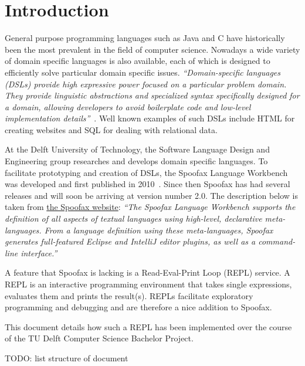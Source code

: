 \chapter{Introduction}
\label{cha:introduction}

General purpose programming languages such as Java and C have historically been
the most prevalent in the field of computer science. Nowadays a wide variety of
domain specific languages is also available, each of which is designed to
efficiently solve particular domain specific issues. \textit{``Domain-specific
languages (DSLs) provide high expressive power focused on a particular problem
domain. They provide linguistic abstractions and specialized syntax
specifically designed for a domain, allowing developers to avoid boilerplate
code and low-level implementation details''}~\cite{Kats10a}. Well known
examples of such DSLs include HTML for creating websites and SQL for dealing
with relational data.

At the Delft University of Technology, the Software Language Design and
Engineering group researches and develops domain specific languages. To
facilitate prototyping and creation of DSLs, the Spoofax Language Workbench was
developed and first published in 2010~\cite{Kats10a}. Since then Spoofax has had
several releases and will soon be arriving at version number 2.0. The
description below is taken from \href{http://spoofax.org}{the Spoofax website}:
\textit{``The Spoofax Language Workbench supports the definition of all aspects
of textual languages using high-level, declarative meta-languages. From a
language definition using these meta-languages, Spoofax generates full-featured
Eclipse and IntelliJ editor plugins, as well as a command-line interface.''}

A feature that Spoofax is lacking is a Read-Eval-Print Loop (REPL) service. A
REPL is an interactive programming environment that takes single expressions,
evaluates them and prints the result(s). REPLs facilitate exploratory
programming and debugging and are therefore a nice addition to Spoofax.

This document details how such a REPL has been implemented over the course of
the TU Delft Computer Science Bachelor Project.

TODO: list structure of document


